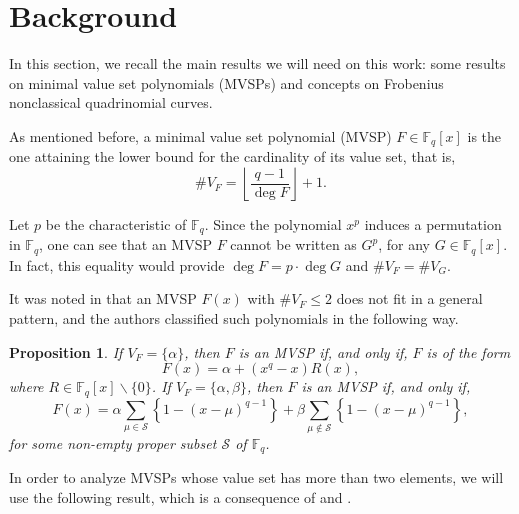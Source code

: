 \documentclass[preprint,12pt]{elsarticle}
\newtheorem{proposition}[theorem]{Proposition}
\begin{document}
\section{Background}\label{section:background}
In this section, we recall the main results we will need on this work: some results on minimal value set polynomials (MVSPs) and concepts on Frobenius nonclassical quadrinomial curves.

As mentioned before, a minimal value set polynomial (MVSP) $F \in \mathbb{F}_q[x]$ is the one attaining the lower bound for the cardinality of its value set, that is,
$$\# V_F = \left\lfloor \frac{q - 1}{\deg F}\right\rfloor + 1.$$

Let $p$ be the characteristic of $\mathbb{F}_q$. Since the polynomial $x^p$ induces a permutation in $\mathbb{F}_q$, one can see that an MVSP $F$ cannot be written as $G^p$, for any $G \in \mathbb{F}_q[x]$. In fact, this equality would provide $\deg F = p\cdot \deg G$ and $\# V_F = \# V_G$.

It was noted in \cite{carlitz61} that an MVSP $F(x)$ with $\# V_F \leq 2$ does not fit in a general pattern, and the authors classified such polynomials in the following way.

\begin{proposition}\label{prop:Vf-menor-que-2}
    If \( V_F = \{\alpha\} \), then \( F \) is an MVSP if, and only if, \( F \) is of the form
$$
F(x) = \alpha + (x^q - x) R(x),
$$
where \( R \in \mathbb{F}_q[x] \backslash\{0\} \). If $V_F = \{\alpha, \beta\}$, then $F$ is an MVSP if, and only if, 
$$
F(x) = \alpha \sum_{\mu \in \mathcal{S}} \left\{ 1 - (x - \mu)^{q - 1} \right\} + \beta \sum_{\mu \notin \mathcal{S}} \left\{ 1 - (x - \mu)^{q - 1} \right\},
$$
for some non-empty proper subset \( \mathcal{S} \) of \( \mathbb{F}_q \).
\end{proposition}

In order to analyze MVSPs whose value set has more than two elements, we will use the following result, which is a consequence of \cite[Equation (13) and Theorem 1]{Mills1964} and \cite[Theorem 2.2]{borges-separated}.
\end{document}
